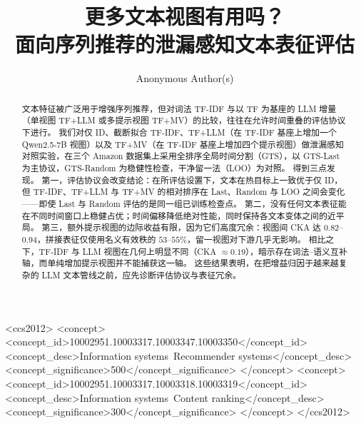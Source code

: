 \documentclass[sigconf,natbib=true,anonymous]{acmart}
\newcommand{\tfidf}{\textsc{TF-IDF}\xspace}
\newcommand{\tfllm}{\textsc{TF+LLM}\xspace}
\newcommand{\tfmv}{\textsc{TF+MV}\xspace}
\begin{document}
\title{更多文本视图有用吗？\\
面向序列推荐的泄漏感知文本表征评估}

\author{Anonymous Author(s)}
\renewcommand{\shortauthors}{Anonymous}

\begin{abstract}
文本特征被广泛用于增强序列推荐，但对词法 \tfidf 与以 TF 为基座的 LLM 增量（单视图 \tfllm 或多提示视图 \tfmv）的比较，往往在允许时间重叠的评估协议下进行。
我们对仅 ID、截断拟合 \tfidf、\tfllm（在 \tfidf 基座上增加一个 Qwen2.5-7B 视图）以及 \tfmv（在 \tfidf 基座上增加四个提示视图）做泄漏感知对照实验，在三个 Amazon 数据集上采用全排序全局时间分割（GTS），以 GTS-Last 为主协议，GTS-Random 为稳健性检查，干净留一法（LOO）为对照。
得到三点发现。
第一，评估协议会改变结论：在所评估设置下，文本在热目标上一致优于仅 ID，但 \tfidf、\tfllm 与 \tfmv 的相对排序在 Last、Random 与 LOO 之间会变化——即使 Last 与 Random 评估的是同一组已训练检查点。
第二，没有任何文本表征能在不同时间窗口上稳健占优；时间偏移降低绝对性能，同时保持各文本变体之间的近平局。
第三，额外提示视图的边际收益有限，因为它们高度冗余：视图间 CKA 达 $0.82$--$0.94$，拼接表征仅使用名义有效秩的 $53$--$55\%$，留一视图对下游几乎无影响。
相比之下，TF-IDF 与 LLM 视图在几何上明显不同（CKA $\approx 0.19$），暗示存在词法--语义互补轴，而单纯增加提示视图并不能捕获这一轴。
这些结果表明，在把增益归因于越来越复杂的 LLM 文本管线之前，应先诊断评估协议与表征冗余。
\end{abstract}

\begin{CCSXML}
<ccs2012>
 <concept>
  <concept_id>10002951.10003317.10003347.10003350</concept_id>
  <concept_desc>Information systems~Recommender systems</concept_desc>
  <concept_significance>500</concept_significance>
 </concept>
 <concept>
  <concept_id>10002951.10003317.10003318.10003319</concept_id>
  <concept_desc>Information systems~Content ranking</concept_desc>
  <concept_significance>300</concept_significance>
 </concept>
</ccs2012>
\end{CCSXML}

\end{document}
